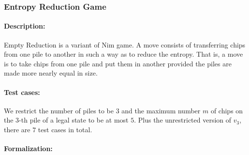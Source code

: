 \documentclass[review]{elsarticle}
\begin{document}
\subsubsection{Entropy Reduction Game \protect\cite{Fer1998}}

\paragraph{Description:} 
Empty Reduction is a variant of Nim game.
A move consists of transferring chips from one pile to another in such a way as to reduce the entropy. 
That is, a move is to take chips from one pile and put them in another provided the piles are made more nearly equal in size. 

\paragraph{Test cases:}
We restrict the number of piles to be $3$ and the maximum number $m$ of chips on the $3$-th pile  of a legal state to be at most $5$.
Plus the unrestricted version of $v_3$, there are $7$ test cases in total.


\paragraph{Formalization:}
\end{document}
